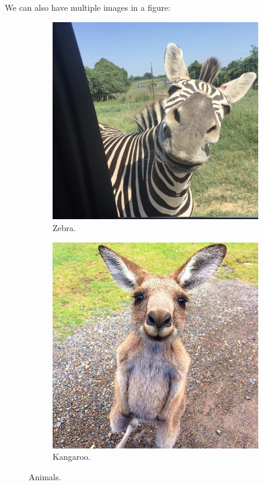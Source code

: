 \documentclass[12pt]{scrarticle}
\begin{document}
We can also have multiple images in a figure:

\begin{figure}[H]
    \centering
    \begin{subfigure}{0.49\textwidth}
        \includegraphics[width=0.9\linewidth]{zebra.jpeg}
        \caption{Zebra.}
    \end{subfigure}
    \begin{subfigure}{0.49\textwidth}
        \includegraphics[width=0.9\linewidth]{kangaroo.jpeg}
        \caption{Kangaroo.}
    \end{subfigure}
    \caption{Animals.}
    \label{fig:animals}
\end{figure}
\end{document}
